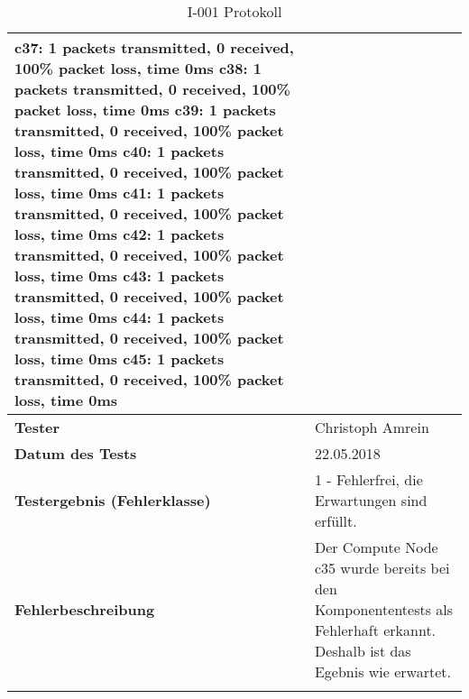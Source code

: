 \begin{longtable}{p{4.5cm}p{11.5cm}}
c37: 1 packets transmitted, 0 received, 100\% packet loss, time 0ms \newline
c38: 1 packets transmitted, 0 received, 100\% packet loss, time 0ms \newline
c39: 1 packets transmitted, 0 received, 100\% packet loss, time 0ms \newline
c40: 1 packets transmitted, 0 received, 100\% packet loss, time 0ms \newline
c41: 1 packets transmitted, 0 received, 100\% packet loss, time 0ms \newline
c42: 1 packets transmitted, 0 received, 100\% packet loss, time 0ms \newline
c43: 1 packets transmitted, 0 received, 100\% packet loss, time 0ms \newline
c44: 1 packets transmitted, 0 received, 100\% packet loss, time 0ms \newline
c45: 1 packets transmitted, 0 received, 100\% packet loss, time 0ms \newline  \\\hline
\cellcolor{heading}\textbf{Tester} & Christoph Amrein  \\\hline
\cellcolor{heading}\textbf{Datum des Tests} & 22.05.2018  \\\hline
\cellcolor{heading}\textbf{Testergebnis \newline (Fehlerklasse)} & 1 - Fehlerfrei, die Erwartungen sind erfüllt. \\\hline
\cellcolor{heading}\textbf{Fehlerbeschreibung} &  Der Compute Node c35 wurde bereits bei den Komponententests als Fehlerhaft erkannt. Deshalb ist das Egebnis wie erwartet. \\\hline
\caption{I-001 Protokoll}
\end{longtable}

